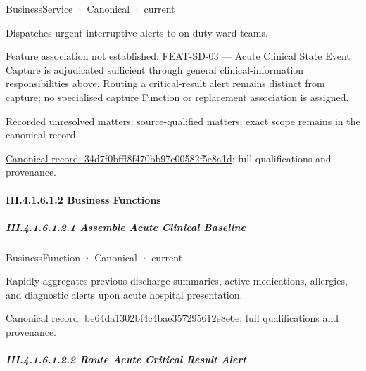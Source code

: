 \label{element:34d7f0bfff8f470bb97c00582f5e8a1d}
{\small BusinessService · Canonical · current}\par

Dispatches urgent interruptive alerts to on-duty ward teams.



Feature association not established: FEAT-SD-03 — Acute Clinical State Event Capture is adjudicated sufficient through general clinical-information responsibilities above. Routing a critical-result alert remains distinct from capture; no specialised capture Function or replacement association is assigned.


{\small Recorded unresolved matters: source-qualified matters; exact scope remains in the canonical record.}\par
{\footnotesize \href{../../../../continuum/business/business-service/34d7f0bfff8f470bb97c00582f5e8a1d.md}{Canonical record: 34d7f0bfff8f470bb97c00582f5e8a1d}; full qualifications and provenance.}\par
\paragraph*{III.4.1.6.1.2 Business Functions}
\label{navigation:III.4.1.6.1.2}

\subparagraph*{III.4.1.6.1.2.1 Assemble Acute Clinical Baseline}
\label{navigation:III.4.1.6.1.2.1}

\label{element:be64da1302bf4c4bae357295612e8e6e}
{\small BusinessFunction · Canonical · current}\par

Rapidly aggregates previous discharge summaries, active medications, allergies, and diagnostic alerts upon acute hospital presentation.


{\footnotesize \href{../../../../continuum/business/business-function/be64da1302bf4c4bae357295612e8e6e.md}{Canonical record: be64da1302bf4c4bae357295612e8e6e}; full qualifications and provenance.}\par
\subparagraph*{III.4.1.6.1.2.2 Route Acute Critical Result Alert}
\label{navigation:III.4.1.6.1.2.2}

